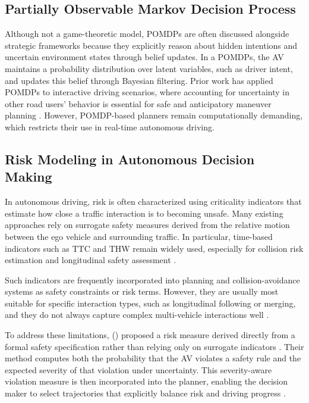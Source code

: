 \subsection{Partially Observable Markov Decision Process}
Although not a game-theoretic model, \acp{POMDP} are
often discussed alongside strategic frameworks because they explicitly reason about hidden intentions and
uncertain environment states through belief updates. In a \acp{POMDP}, the \ac{AV} maintains
a probability distribution over latent variables, such as driver intent, and updates this belief through
Bayesian filtering. Prior work has applied \acp{POMDP} to interactive driving scenarios, where accounting
for uncertainty in other road users’ behavior is essential for safe and anticipatory maneuver planning
\cite{7995949}. However, \ac{POMDP}-based planners remain computationally demanding, which restricts their use in
real-time autonomous driving.

\subsection{Risk Modeling in Autonomous Decision Making}
In autonomous driving, risk is often characterized using criticality indicators that estimate how close a traffic interaction is to becoming unsafe. 
Many existing approaches rely on surrogate safety measures derived from the relative motion between the ego vehicle and surrounding traffic. In particular, 
time-based indicators such as \ac{TTC} and \ac{THW} remain widely used, especially for collision risk estimation and longitudinal safety assessment 
\cite{Westhofen_2022,wevj14120348}.

\par Such indicators are frequently incorporated into planning and collision-avoidance systems as safety constraints or risk terms. However, they are usually 
most suitable for specific interaction types, such as longitudinal following or merging, and they do not always capture complex multi-vehicle interactions 
well \cite{Westhofen_2022,wevj14120348}.

\par To address these limitations, \citeauthor{inproceedingsRisk-aware} (\citeyear{inproceedingsRisk-aware}) proposed a risk measure derived directly from a formal safety specification 
rather than relying only on surrogate indicators \cite{inproceedingsRisk-aware}.
Their method computes both the probability that the \ac{AV} violates a safety rule and the expected severity of that violation under uncertainty. 
This severity-aware violation measure is then incorporated into the planner, enabling the decision maker to select trajectories that 
explicitly balance risk and driving progress \cite{inproceedingsRisk-aware}.



